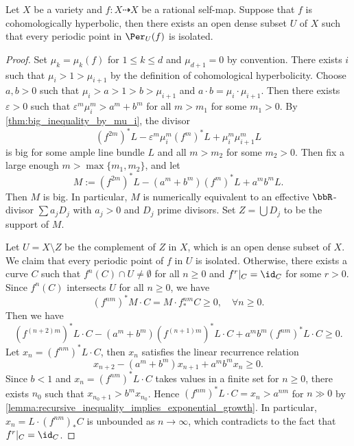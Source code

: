   \begin{proposition}\label{prop:isolated_periodic_points_for_cohomologically_hyperbolic_maps}
    Let $X$ be a variety and $f: X \dashrightarrow X$ be a rational self-map.
    Suppose that $f$ is cohomologically hyperbolic, then there exists an open dense subset $U$ of $X$ such that every periodic point in $\Per_U(f)$ is isolated.
  \end{proposition}
  \begin{proof}
    Set $\mu_k = \mu_k(f)$ for $1 \leq k \leq d$ and $\mu_{d+1} = 0$ by convention.
    There exists $i$ such that $\mu_i > 1 > \mu_{i+1}$ by the definition of cohomological hyperbolicity.
    Choose $a,b > 0$ such that $\mu_i > a > 1 > b > \mu_{i+1}$ and $a \cdot b = \mu_i \cdot \mu_{i+1}$.
    Then there exists $\varepsilon > 0$ such that $\varepsilon^m \mu_i^m > a^m + b^m$ for all $m > m_1$ for some $m_1 > 0$.
    By \cref{thm:big_inequality_by_mu_i}, the divisor
    \[ (f^{2m})^*L - \varepsilon^m \mu_i^m (f^m)^*L + \mu_i^m \mu_{i+1}^m L \]
    is big for some ample line bundle $L$ and all $m > m_2$ for some $m_2 > 0$.
    Then fix a large enough $m > \max\{m_1, m_2\}$, and let 
    \[ M := (f^{2m})^*L - (a^m + b^m) (f^m)^*L + a^m b^m L. \]
    Then $M$ is big.
    In particular, $M$ is numerically equivalent to an effective $\bbR$-divisor $\sum a_j D_j$ with $a_j > 0$ and $D_j$ prime divisors.
    Set $Z = \bigcup D_j$ to be the support of $M$.

    Let $U = X \setminus Z$ be the complement of $Z$ in $X$, which is an open dense subset of $X$.
    We claim that every periodic point of $f$ in $U$ is isolated.
    Otherwise, there exists a curve $C$ such that $f^n(C) \cap U \neq \emptyset$ for all $n \geq 0$ and $f^r|_C = \id_C$ for some $r > 0$.
    Since $f^{n}(C)$ intersects $U$ for all $n \geq 0$, we have 
    \begin{equation}\label{eq:inequality_for_curve_C_in_proof_of_isolated_periodic_points_for_cohomologically_hyperbolic_maps}
      (f^{n m})^*M \cdot C = M \cdot f^{n m}_*C \geq 0, \quad \forall n \geq 0.
    \end{equation}
    Then we have 
    \[ (f^{(n+2)m})^*L \cdot C - (a^m + b^m) (f^{(n +1)m})^*L \cdot C + a^m b^m (f^{n m})^*L \cdot C \geq 0. \]
    Let $x_{n} = (f^{nm})^*L \cdot C$, then $x_n$ satisfies the linear recurrence relation
    \[ x_{n+2} - (a^m + b^m) x_{n+1} + a^m b^m x_n \geq 0. \]
    Since $b<1$ and $x_n = (f^{nm})^*L \cdot C$ takes values in a finite set for $n \geq 0$, there exists $n_0$ such that $x_{n_0+1} > b^m x_{n_0}$.
    Hence $(f^{nm})^*L \cdot C = x_n >  a^{nm}$ for $n \gg 0$ by \cref{lemma:recursive_inequality_implies_exponential_growth}.
    In particular, $x_n = L \cdot (f^{nm})_*C$ is unbounded as $n \to \infty$, which contradicts to the fact that $f^r|_C = \id_C$.
  \end{proof}

